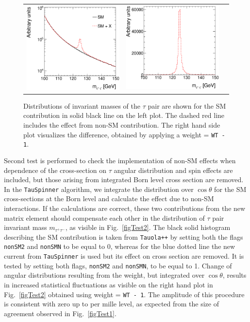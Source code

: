 \documentclass[12pt]{article}
\begin{document}
\begin{figure}[htp!]
\begin{tabular}{ccc}
\includegraphics[width=0.48\columnwidth]{tau_tau_mass.eps} & 
\includegraphics[width=0.48\columnwidth]{tau_tau_mass_WT-1.eps} 
\end{tabular}
\caption{Distributions of invariant masses of the $\tau$ pair are shown for the SM contribution in solid black line on the left plot.
The dashed red line includes the effect from non-SM contribution.
The right hand side plot visualizes the difference, obtained by applying a weight = {\tt WT - 1}.
\label{figBase}}
\end{figure}

Second test is performed to check the implementation  of non-SM effects 
when dependence of the cross-section on $\tau$ angular distribution and spin effects are included,
but those arising from integrated Born level cross section are removed. 
In the {\tt TauSpinner} algorithm, we integrate the distribution over $\cos\theta$ 
for the SM cross-sections at the Born level and calculate the effect due to non-SM interactions.
If the calculations are correct, these two contributions from the new matrix element should compensate each other
in the distribution of $\tau$ pair invariant mass $m_{\tau^+\tau^-}$, as visible in Fig.~\ref{figTest2}.
The black solid histogram describing the SM contribution is taken from {\tt Tauola++} by setting both the flags {\tt nonSM2} and {\tt nonSMN} to be equal to 0,
whereas for the blue dotted line the new current from {\tt TauSpinner} is used  but  its effect on cross section are removed. 
It is tested by setting both flags, {\tt nonSM2} and {\tt nonSMN}, to be equal to 1. 
Change of angular distributions resulting from the weight, 
but integrated over $\cos\theta$, results in increased  statistical fluctuations 
as visible on the right hand plot in Fig.~\ref{figTest2} obtained using weight = {\tt WT - 1}.
The amplitude of this procedure is consistent with zero up to per mille level, 
as expected from the size of agreement observed in Fig.~\ref{figTest1}.
\end{document}
